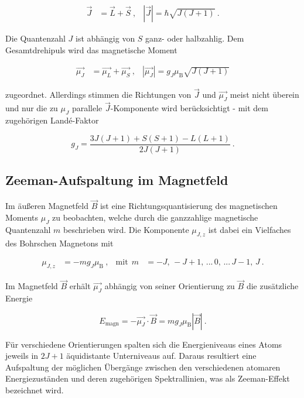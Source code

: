 \vspace{-15pt}
\begin{align}
    \vec{J} &= \vec{L} + \vec{S} \:, & |\vec{J}| = \hbar \sqrt{J(J+1)} \: .
\end{align}

Die Quantenzahl $J$ ist abhängig von $S$ ganz- oder halbzahlig.
Dem Gesamtdrehipuls wird das magnetische Moment

\vspace{-15pt}
\begin{align}
    \vec{\mu_J} &= \vec{\mu_L} + \vec{\mu_S} \:, & |\vec{\mu_J}| = g_J \mu_\text{B} \sqrt{J(J+1)}
\end{align}

zugeordnet. Allerdings stimmen die Richtungen von $\vec{J}$ und $\vec{\mu_J}$ meist nicht überein und
nur die zu $\mu_J$ parallele $\vec{J}$-Komponente wird berücksichtigt - mit dem zugehörigen Landé-Faktor 

\begin{equation}
    g_J = \frac{3J(J+1) + S(S+1) - L(L+1)}{2J(J+1)}\: .
    \label{eqn:lande}
\end{equation}

\subsection{Zeeman-Aufspaltung im Magnetfeld}

Im äußeren Magnetfeld $\vec{B}$ ist eine Richtungsquantisierung des magnetischen Moments
$\mu_J$ zu beobachten, welche durch die ganzzahlige magnetische Quantenzahl $m$ beschrieben wird.
Die Komponente $\mu_{J,z}$ ist dabei ein Vielfaches des Bohrschen Magnetons mit

\vspace{-15pt}
\begin{align}
    \mu_{J,z} &= - m g_J \mu_\text{B} \: , & \text{mit}\:\: m &= -J,\, -J+1,\, ...\, 0,\, ...\, J-1,\, J \: . 
\end{align}

Im Magnetfeld $\vec{B}$ erhält $\vec{\mu_J}$ abhängig von seiner Orientierung zu $\vec{B}$
die zusätzliche Energie

\begin{equation}
    E_\text{magn} = - \vec{\mu_J} \cdot \vec{B} = m g_J \mu_\text{B} |\vec{B}| \: .
    \label{eqn:aufspaltung}
\end{equation}

Für verschiedene Orientierungen spalten sich die Energieniveaus eines Atoms jeweils
in $2J+1$ äquidistante Unterniveaus auf. Daraus resultiert eine Aufspaltung
der möglichen Übergänge zwischen den verschiedenen atomaren Energiezuständen und deren 
zugehörigen Spektrallinien, was als Zeeman-Effekt bezeichnet wird.

